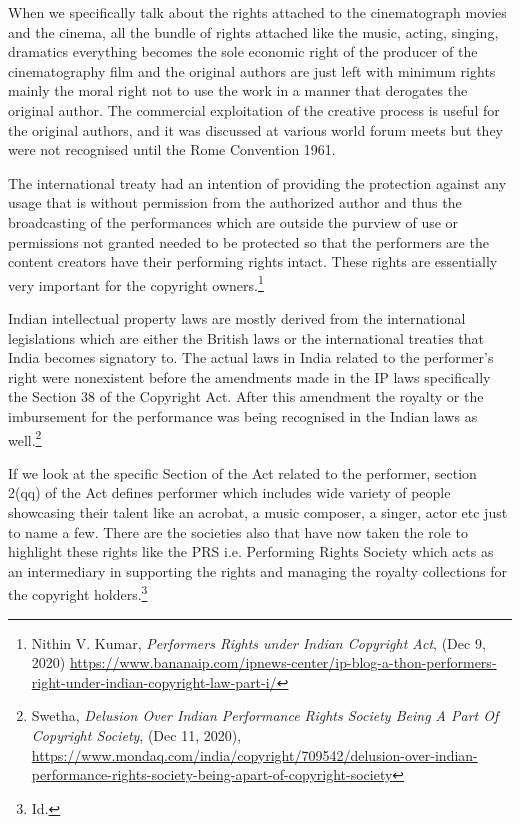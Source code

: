 \begin{multicols}{2}
\noi
When we specifically talk about the rights attached to the cinematograph movies and the
cinema, all the bundle of rights attached like the music, acting, singing, dramatics everything
becomes the sole economic right of the producer of the cinematography film and the original
authors are just left with minimum rights mainly the moral right not to use the work in a
manner that derogates the original author. The commercial exploitation of the creative
process is useful for the original authors, and it was discussed at various world forum meets
but they were not recognised until the Rome Convention 1961.

\noi
The international treaty had an intention of providing the protection against any usage that is
without permission from the authorized author and thus the broadcasting of the performances
which are outside the purview of use or permissions not granted needed to be protected so
that the performers are the content creators have their performing rights intact. These rights
are essentially very important for the copyright owners.\footnote{Nithin V. Kumar, \textit{Performers Rights under Indian Copyright Act}, (Dec 9, 2020) \url{https://www.bananaip.com/ipnews-center/ip-blog-a-thon-performers-right-under-indian-copyright-law-part-i/}}

\noi
Indian intellectual property laws are mostly derived from the international legislations which
are either the British laws or the international treaties that India becomes signatory to. The
actual laws in India related to the performer’s right were nonexistent before the amendments
made in the IP laws specifically the Section 38 of the Copyright Act. After this amendment
the royalty or the imbursement for the performance was being recognised in the Indian laws
as well.\footnote{Swetha, \textit{Delusion Over Indian Performance Rights Society Being A Part Of Copyright Society}, (Dec 11, 2020),
\url{https://www.mondaq.com/india/copyright/709542/delusion-over-indian-performance-rights-society-being-apart-of-copyright-society}}

\noi
If we look at the specific Section of the Act related to the performer, section 2(qq) of the Act
defines performer which includes wide variety of people showcasing their talent like an
acrobat, a music composer, a singer, actor etc just to name a few. There are the societies also
that have now taken the role to highlight these rights like the PRS i.e. Performing Rights
Society which acts as an intermediary in supporting the rights and managing the royalty
collections for the copyright holders.\footnote{Id.}


\end{multicols}
